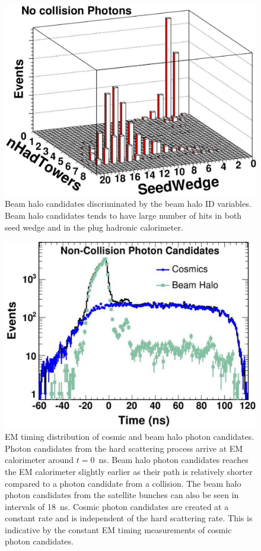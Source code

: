 \documentclass[11pt]{article}
\begin{document}
\begin{figure}[h]
 \centering
 \includegraphics[scale=0.5]{BeamHalo_Topology.pdf}
 \caption{Beam halo candidates discriminated by the beam halo ID variables. Beam halo candidates tends to have large number of hits in both seed wedge and in the plug hadronic calorimeter.}
 \label{fig:BeamHalo_Identification}
\end{figure}



\begin{figure}[htb!]
 \centering
 \includegraphics[scale=0.5]{./CosmicBeamHalo_EMtiming.pdf}
 \caption{EM timing distribution of cosmic and beam halo photon candidates. Photon candidates from the hard scattering process arrive at EM calorimeter around $t=0$~ns. Beam halo photon candidates reaches the EM calorimeter slightly earlier as their path is relatively shorter compared to a photon candidate from a collision. The beam halo photon candidates from the satellite bunches can also be seen in intervals of 18~ns. Cosmic photon candidates are created at a constant rate and is independent of the hard scattering rate. This is indicative by the constant EM timing measurements of cosmic photon candidates.}
 \label{fig:CosmicBeamHaloEMtiming}
\end{figure}
\end{document}
